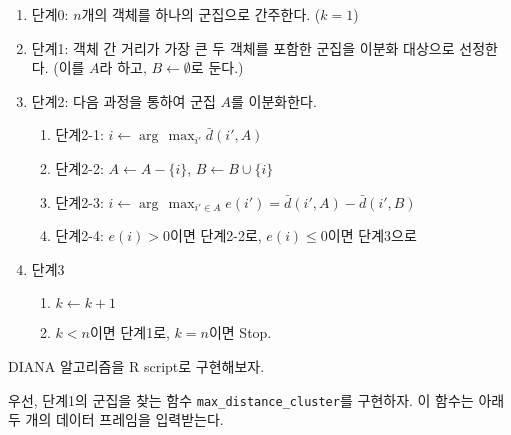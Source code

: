 \documentclass[]{book}
\providecommand{\tightlist}{%
  \setlength{\itemsep}{0pt}\setlength{\parskip}{0pt}}
\begin{document}
\begin{enumerate}
\def\labelenumi{\arabic{enumi}.}
\tightlist
\item
  단계0: \(n\)개의 객체를 하나의 군집으로 간주한다. (\(k = 1\))
\item
  단계1: 객체 간 거리가 가장 큰 두 객체를 포함한 군집을 이분화 대상으로 선정한다. (이를 \(A\)라 하고, \(B \leftarrow \emptyset\)로 둔다.)
\item
  단계2: 다음 과정을 통하여 군집 \(A\)를 이분화한다.

  \begin{enumerate}
  \def\labelenumii{\arabic{enumii}.}
  \tightlist
  \item
    단계2-1: \(i \leftarrow \arg\,\max_{i'} \bar{d}(i', A)\)
  \item
    단계2-2: \(A \leftarrow A - \{i\}\), \(B \leftarrow B \cup \{i\}\)
  \item
    단계2-3: \(i \leftarrow \arg\,\max_{i' \in A} e(i') = \bar{d}(i', A) - \bar{d}(i', B)\)
  \item
    단계2-4: \(e(i) > 0\)이면 단계2-2로, \(e(i) \le 0\)이면 단계3으로
  \end{enumerate}
\item
  단계3

  \begin{enumerate}
  \def\labelenumii{\arabic{enumii}.}
  \tightlist
  \item
    \(k \leftarrow k + 1\)
  \item
    \(k < n\)이면 단계1로, \(k = n\)이면 Stop.
  \end{enumerate}
\end{enumerate}

DIANA 알고리즘을 R script로 구현해보자.

우선, 단계1의 군집을 찾는 함수 \texttt{max\_distance\_cluster}를 구현하자. 이 함수는 아래 두 개의 데이터 프레임을 입력받는다.
\end{document}
